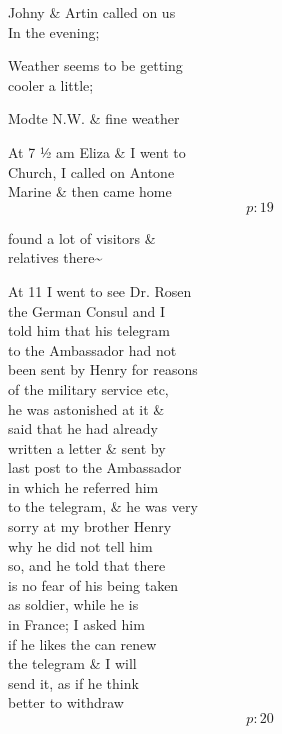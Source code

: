 \documentclass{report}
\begin{document}
	\par{
 	Johny \& Artin called on us\ \\In the evening;\ \\
	}

	\par{
 	Weather seems to be getting\ \\cooler a little;\ \\
	}

	\par{
 	Modte N.W. \& fine weather\ \\
	}

	\par{
 	At 7 ½ am Eliza \& I went to\ \\Church, I called on Antone\ \\Marine \& then came home\ \\
  \[p: 19 \]

	}



	\par{
 	found a lot of visitors \&\ \\relatives there\~{}\ \\
	}

	\par{
 	At 11 I went to see Dr. Rosen\ \\the German Consul and I\ \\told him that his telegram\ \\to the Ambassador had not\ \\been sent by Henry for reasons\ \\of the military service etc,\ \\he was astonished at it \&\ \\said that he had already\ \\written a letter \& sent by\ \\last post to the Ambassador\ \\in which he referred him\ \\to the telegram, \& he was very\ \\sorry at my brother Henry\ \\why he did not tell him\ \\so, and he told that there\ \\is no fear of his being taken\ \\as soldier, while he is\ \\in France; I asked him\ \\if he likes the can renew\ \\the telegram \& I will\ \\send it, as if he think\ \\better to withdraw\ \\
  \[p: 20 \]

	}
\end{document}

